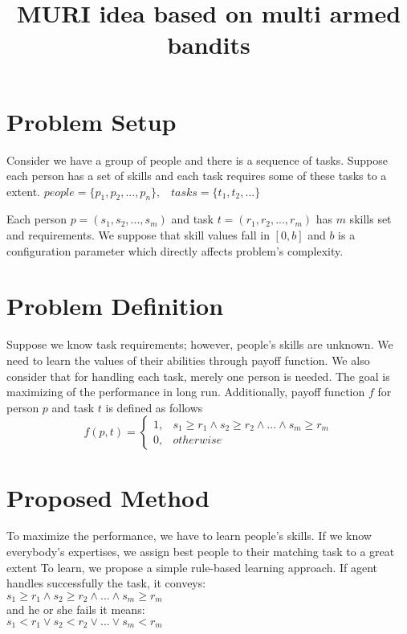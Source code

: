 \documentclass[]{article}
\title{MURI idea based on multi armed bandits}
\author{}
\begin{document}
\maketitle
\linenumbers
\setpagewiselinenumbers

\section{Problem Setup}
Consider we have a group of people and there is a sequence of tasks. Suppose each person has a set of skills and each task requires some of these tasks to a extent.\newline
$people = \{p_1, p_2, ..., p_n\}, \;\;\;    
tasks = \{t_1, t_2, ...\}$

Each person $p=(s_1, s_2, ..., s_m)$ and task $t=(r_1, r_2 , ..., r_m)$ has $m$ skills set and requirements. We suppose that skill values fall in $[0, b]$ and $b$ is a configuration parameter which directly affects problem's complexity.

\section{Problem Definition}
Suppose we know task requirements; however, people's skills are unknown. We need to learn the values of their abilities through payoff function. We also consider that for handling each task, merely one person is needed. The goal is maximizing of the performance in long run.
Additionally, payoff function $f$ for person $p$ and task $t$ is defined as follows
\begin{equation}
	f(p,t) = 
	\begin{cases}
		1,	& s_1 \geq r_1 \wedge s_2 \geq r_2 \wedge ... \wedge s_m \geq r_m\\
		0,	& otherwise
	\end{cases}
\end{equation}

\section{Proposed Method}
To maximize the performance, we have to learn people's skills. If we know everybody's expertises, we assign best people to their matching task to a great extent
To learn, we propose a simple rule-based learning approach. If agent handles successfully the task, it conveys:\\
$s_1 \geq r_1 \wedge s_2 \geq r_2 \wedge ... \wedge s_m \geq r_m$\\
and he or she fails it means:\\
$s_1 < r_1 \vee s_2 < r_2 \vee ... \vee s_m < r_m$
\end{document}
